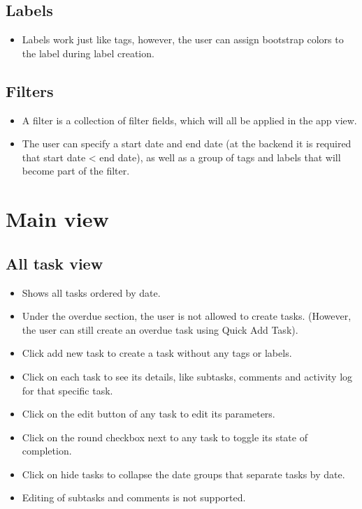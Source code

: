 \documentclass{article}
\begin{document}
\subsection{Labels}
\begin{itemize}
  \item Labels work just like tags, however, the user can assign bootstrap colors to the label during label creation.
\end{itemize}

\subsection{Filters}
\begin{itemize}
  \item A filter is a collection of filter fields, which will all be applied in the app view.
  \item The user can specify a start date and end date (at the backend it is required that start date < end date), as well as a group of tags and labels that will become part of the filter.
  
\end{itemize}

\section{Main view}
\subsection{All task view}
\begin{itemize}
  \item Shows all tasks ordered by date.
  \item Under the overdue section, the user is not allowed to create tasks. (However, the user can still create an overdue task using Quick Add Task).
  \item Click add new task to create a task without any tags or labels.
  \item Click on each task to see its details, like subtasks, comments and activity log for that specific task.
  \item Click on the edit button of any task to edit its parameters.
  \item Click on the round checkbox next to any task to toggle its state of completion.
  \item Click on hide tasks to collapse the date groups that separate tasks by date.
  \item Editing of subtasks and comments is not supported.
\end{itemize}
\end{document}
